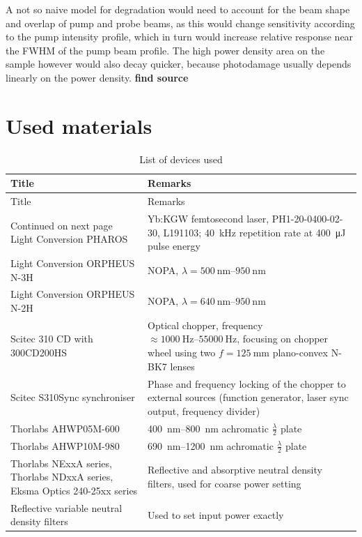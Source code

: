 \documentclass[twoside,openright]{scrreprt}
\begin{document}
A not so naive model for degradation would need to account for the beam shape and overlap of pump and probe beams, as this would change sensitivity according to the pump intensity profile, which in turn would increase relative response near the FWHM of the pump beam profile. The high power density area on the sample however would also decay quicker, because photodamage usually depends linearly on the power density. \textbf{find source}

\chapter*{Used materials}
\begin{longtable}{p{}p{}}
    \caption{List of devices used}
    \label{tab:devices} \\
    \toprule 
    Title & Remarks \\
    \midrule
    \endfirsthead
    \toprule 
    Title & Remarks \\
    \midrule
    \endhead
    \midrule
    Continued on next page
    \endfoot
    \bottomrule
    \endlastfoot
    Light Conversion PHAROS & Yb:KGW femtosecond laser, PH1-20-0400-02-30, L191103; \SI{40}{\kilo\hertz} repetition rate at \SI{400}{\micro\joule} pulse energy \\
    Light Conversion ORPHEUS N-3H & NOPA, $ \lambda = \SIrange{500}{950}{\nano\meter} $ \\
    Light Conversion ORPHEUS N-2H & NOPA, $ \lambda = \SIrange{640}{950}{\nano\meter} $ \\
    Scitec 310 CD with 300CD200HS & Optical chopper, frequency $\approx \SIrange{1000}{55000}{\hertz}$, focusing on chopper wheel using two $f=\SI{125}{\milli\meter}$ plano-convex N-BK7 lenses \\
    Scitec S310Sync synchroniser & Phase and frequency locking of the chopper to external sources (function generator, laser sync output, frequency divider) \\
    Thorlabs AHWP05M-600 & \SIrange{400}{800}{\nano\meter} achromatic $\frac{\lambda}{2}$ plate \\
    Thorlabs AHWP10M-980 & \SIrange{690}{1200}{\nano\meter} achromatic $\frac{\lambda}{2}$ plate \\
    Thorlabs NExxA series, Thorlabs NDxxA series, Eksma Optics 240-25xx series & Reflective and absorptive neutral density filters, used for coarse power setting \\
    Reflective variable neutral density filters & Used to set input power exactly \\

\end{longtable}
\end{document}
